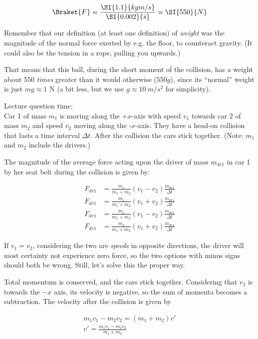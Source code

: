 \begin{equation}
\Braket{F} = \frac{\SI{1.1}{kg m/s}}{\SI{0.002}{s}} = \SI{550}{N}
\end{equation}

Remember that our definition (at least one definition) of \emph{weight} was the magnitude of the normal force exerted by e.g. the floor, to counteract gravity. (It could also be the tension in a rope, pulling you upwards.)

That means that this ball, during the short moment of the collision, has a weight about 550 \emph{times} greater than it would otherwise ($550 g$), since its ``normal'' weight is just $m g \approx 1$ N (a bit less, but we use $g \approx \SI{10}{m/s^2}$ for simplicity).

Lecture question time:\\
Car 1 of mass $m_1$ is moving along the +$x$-axis with speed $v_1$ towards car 2 of mass $m_2$ and speed $v_2$ moving along the -$x$-axis. They have a head-on collision that lasts a time interval $\Delta t$. After the collision the cars stick together. (Note: $m_1$ and $m_2$ include the drivers.)

The magnitude of the average force acting upon the driver of mass $m_{dr1}$ in car 1 by her seat belt during the collision is given by:

\begin{align}
F_{dr1} &= \frac{m_1}{m_1 + m_2} (v_1 - v_2) \frac{m_{dr1}}{\Delta t}\\
F_{dr1} &= \frac{m_1}{m_1 + m_2} (v_1 + v_2) \frac{m_{dr1}}{\Delta t}\\
F_{dr1} &= \frac{m_2}{m_1 + m_2} (v_1 - v_2) \frac{m_{dr1}}{\Delta t}\\
F_{dr1} &= \frac{m_2}{m_1 + m_2} (v_1 + v_2) \frac{m_{dr1}}{\Delta t}
\end{align}

If $v_1 = v_2$, considering the two are \emph{speeds} in opposite directions, the driver will most certainty not experience zero force, so the two options with minus signs should both be wrong. Still, let's solve this the proper way.

Total momentum is conserved, and the cars stick together. Considering that $v_2$ is towards the $-x$ axis, its velocity is negative, so the sum of momenta becomes a subtraction. The velocity after the collision is given by

\begin{align}
m_1 v_1 - m_2 v_2 = (m_1 + m_2) v'\\
v' = \frac{m_1 v_1 - m_2 v_2}{m_1 + m_2}
\end{align}

